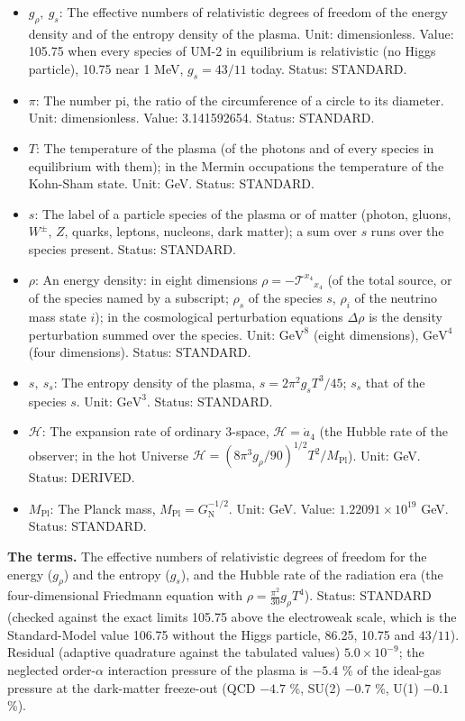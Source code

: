 \documentclass[
  10pt,
]{article}
\providecommand{\tightlist}{%
  \setlength{\itemsep}{0pt}\setlength{\parskip}{0pt}}
\begin{document}
\begin{itemize}
\tightlist
\item
  \(g_\rho,\ g_s\): The effective numbers of relativistic degrees of
  freedom of the energy density and of the entropy density of the
  plasma. Unit: dimensionless. Value: 105.75 when every species of UM-2
  in equilibrium is relativistic (no Higgs particle), 10.75 near 1 MeV,
  \(g_s = 43/11\) today. Status: STANDARD.
\item
  \(\pi\): The number pi, the ratio of the circumference of a circle to
  its diameter. Unit: dimensionless. Value: 3.141592654. Status:
  STANDARD.
\item
  \(T\): The temperature of the plasma (of the photons and of every
  species in equilibrium with them); in the Mermin occupations the
  temperature of the Kohn-Sham state. Unit: GeV. Status: STANDARD.
\item
  \(s\): The label of a particle species of the plasma or of matter
  (photon, gluons, \(W^\pm\), \(Z\), quarks, leptons, nucleons, dark
  matter); a sum over \(s\) runs over the species present. Status:
  STANDARD.
\item
  \(\rho\): An energy density: in eight dimensions
  \(\rho = -\mathcal{T}^{x_4}{}_{x_4}\) (of the total source, or of the
  species named by a subscript; \(\rho_s\) of the species \(s\),
  \(\rho_i\) of the neutrino mass state \(i\)); in the cosmological
  perturbation equations \(\Delta\rho\) is the density perturbation
  summed over the species. Unit: \(\mathrm{GeV}^{8}\) (eight
  dimensions), \(\mathrm{GeV}^{4}\) (four dimensions). Status: STANDARD.
\item
  \(s,\ s_s\): The entropy density of the plasma,
  \(s = 2\pi^2g_sT^3/45\); \(s_s\) that of the species \(s\). Unit:
  \(\mathrm{GeV}^{3}\). Status: STANDARD.
\item
  \(\mathcal{H}\): The expansion rate of ordinary 3-space,
  \(\mathcal{H} = \dot a_4\) (the Hubble rate of the observer; in the
  hot Universe
  \(\mathcal{H} = (8\pi^3g_\rho/90)^{1/2}T^2/M_{\mathrm{Pl}}\)). Unit:
  GeV. Status: DERIVED.
\item
  \(M_{\mathrm{Pl}}\): The Planck mass,
  \(M_{\mathrm{Pl}} = G_{\mathrm{N}}^{-1/2}\). Unit: GeV. Value:
  \(1.22091\times10^{19}\) GeV. Status: STANDARD.
\end{itemize}

\textbf{The terms.} The effective numbers of relativistic degrees of
freedom for the energy (\(g_\rho\)) and the entropy (\(g_s\)), and the
Hubble rate of the radiation era (the four-dimensional Friedmann
equation with \(\rho = \frac{\pi^2}{30}g_\rho T^4\)). Status: STANDARD
(checked against the exact limits 105.75 above the electroweak scale,
which is the Standard-Model value 106.75 without the Higgs particle,
86.25, 10.75 and \(43/11\)). Residual (adaptive quadrature against the
tabulated values) \(5.0\times10^{-9}\); the neglected order-\(\alpha\)
interaction pressure of the plasma is \(-5.4\) \% of the ideal-gas
pressure at the dark-matter freeze-out (QCD \(-4.7\) \%, SU(2) \(-0.7\)
\%, U(1) \(-0.1\) \%).
\end{document}
